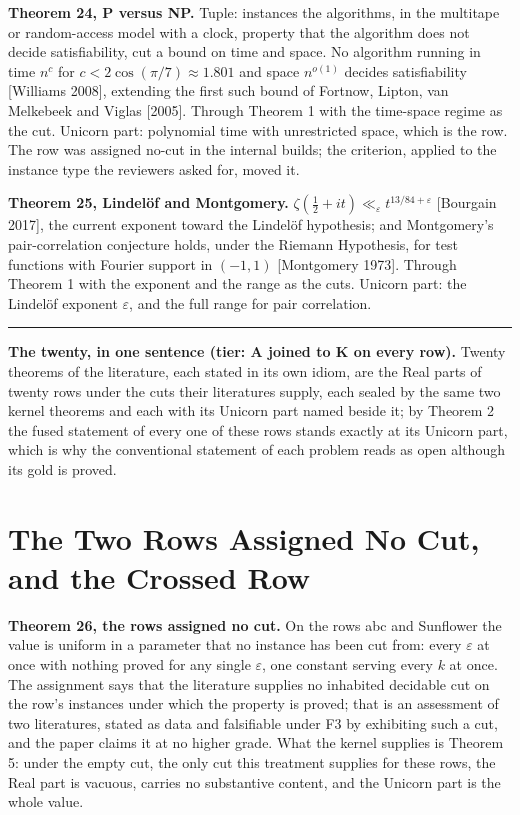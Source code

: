 \documentclass[10pt]{article}
\newenvironment{jbox}{\par\vspace{2pt}\noindent\color{accent}\rule{\columnwidth}{0.8pt}\par\vspace{-2pt}\small}{\par\vspace{2pt}}
\begin{document}
\textbf{Theorem 24, P versus NP.} Tuple: instances the algorithms, in
the multitape or random-access model with a clock, property that the
algorithm does not decide satisfiability, cut a bound on time and space.
No algorithm running in time \(n^{c}\) for
\(c < 2\cos(\pi/7) \approx 1.801\) and space \(n^{o(1)}\) decides
satisfiability {[}Williams 2008{]}, extending the first such bound of
Fortnow, Lipton, van Melkebeek and Viglas {[}2005{]}. Through Theorem 1
with the time-space regime as the cut. Unicorn part: polynomial time
with unrestricted space, which is the row. The row was assigned no-cut
in the internal builds; the criterion, applied to the instance type the
reviewers asked for, moved it.

\textbf{Theorem 25, Lindelöf and Montgomery.}
\(\zeta(\tfrac12 + it) \ll_\varepsilon t^{13/84 + \varepsilon}\)
{[}Bourgain 2017{]}, the current exponent toward the Lindelöf
hypothesis; and Montgomery's pair-correlation conjecture holds, under
the Riemann Hypothesis, for test functions with Fourier support in
\((-1, 1)\) {[}Montgomery 1973{]}. Through Theorem 1 with the exponent
and the range as the cuts. Unicorn part: the Lindelöf exponent
\(\varepsilon\), and the full range for pair correlation.

\begin{jbox}
\textbf{The twenty, in one sentence (tier: A joined to K on every row).} Twenty theorems of the literature, each stated in its own idiom, are the Real parts of twenty rows under the cuts their literatures supply, each sealed by the same two kernel theorems and each with its Unicorn part named beside it; by Theorem 2 the fused statement of every one of these rows stands exactly at its Unicorn part, which is why the conventional statement of each problem reads as open although its gold is proved.
\end{jbox}

\hypertarget{the-two-rows-assigned-no-cut-and-the-crossed-row}{%
\section{The Two Rows Assigned No Cut, and the Crossed
Row}\label{the-two-rows-assigned-no-cut-and-the-crossed-row}}

\textbf{Theorem 26, the rows assigned no cut.} On the rows abc and
Sunflower the value is uniform in a parameter that no instance has been
cut from: every \(\varepsilon\) at once with nothing proved for any
single \(\varepsilon\), one constant serving every \(k\) at once. The
assignment says that the literature supplies no inhabited decidable cut
on the row's instances under which the property is proved; that is an
assessment of two literatures, stated as data and falsifiable under F3
by exhibiting such a cut, and the paper claims it at no higher grade.
What the kernel supplies is Theorem 5: under the empty cut, the only cut
this treatment supplies for these rows, the Real part is vacuous,
carries no substantive content, and the Unicorn part is the whole value.
\end{document}
